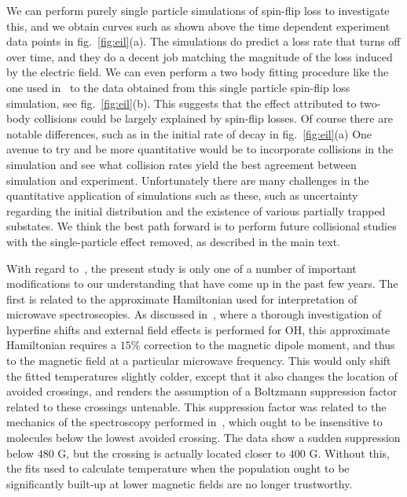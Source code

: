 \documentclass[%
 reprint,
 amsmath,amssymb,
 aps,
prl,
]{revtex4-1}
\begin{document}
We can perform purely single particle simulations of spin-flip loss to investigate this, and we obtain curves such as shown above the time dependent experiment data points in fig.~\ref{fig:eil}(a).
The simulations do predict a loss rate that turns off over time, and they do a decent job matching the magnitude of the loss induced by the electric field.
We can even perform a two body fitting procedure like the one used in~\cite{Stuhl2013} to the data obtained from this single particle spin-flip loss simulation, see fig.~\ref{fig:eil}(b). 
This suggests that the effect attributed to two-body collisions could be largely explained by spin-flip losses.
Of course there are notable differences, such as in the initial rate of decay in fig.~\ref{fig:eil}(a) 
One avenue to try and be more quantitative would be to incorporate collisions in the simulation and see what collision rates yield the best agreement between simulation and experiment.
Unfortunately there are many challenges in the quantitative application of simulations such as these, such as uncertainty regarding the initial distribution and the existence of various partially trapped substates.
We think the best path forward is to perform future collisional studies with the single-particle effect removed, as described in the main text.

With regard to~\cite{Stuhl2012evap}, the present study is only one of a number of important modifications to our understanding that have come up in the past few years. 
The first is related to the approximate Hamiltonian used for interpretation of microwave spectroscopies. 
As discussed in~\cite{Maeda2015}, where a thorough investigation of hyperfine shifts and external field effects is performed for OH, this approximate Hamiltonian requires a $15\%$ correction to the magnetic dipole moment, and thus to the magnetic field at a particular microwave frequency. 
This would only shift the fitted temperatures slightly colder, except that it also changes the location of avoided crossings, and renders the assumption of a Boltzmann suppression factor related to these crossings untenable.
This suppression factor was related to the mechanics of the spectroscopy performed in~\cite{Stuhl2012evap}, which ought to be insensitive to molecules below the lowest avoided crossing.
The data show a sudden suppression below $480\text{ G}$, but the crossing is actually located closer to $400\text{ G}$.
Without this, the fits used to calculate temperature when the population ought to be significantly built-up at lower magnetic fields are no longer trustworthy. 
\end{document}
